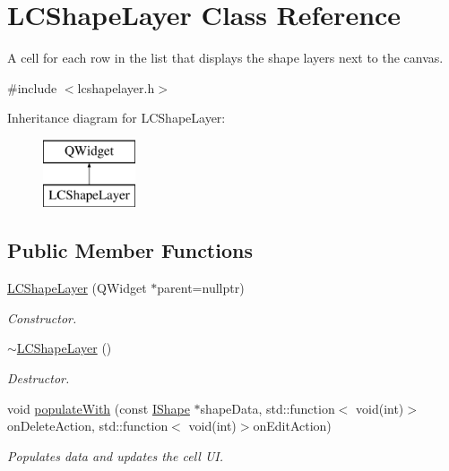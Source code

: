 \hypertarget{class_l_c_shape_layer}{}\section{L\+C\+Shape\+Layer Class Reference}
\label{class_l_c_shape_layer}


A cell for each row in the list that displays the shape layers next to the canvas.  




{\ttfamily \#include $<$lcshapelayer.\+h$>$}

Inheritance diagram for L\+C\+Shape\+Layer\+:\begin{figure}[H]
\begin{center}
\leavevmode
\includegraphics[height=2.000000cm]{class_l_c_shape_layer}
\end{center}
\end{figure}
\subsection*{Public Member Functions}
\begin{DoxyCompactItemize}
\item 
\mbox{\hyperlink{class_l_c_shape_layer_aea8d38a0195a22946abd338d8da618b7}{L\+C\+Shape\+Layer}} (Q\+Widget $\ast$parent=nullptr)
\begin{DoxyCompactList}\small\item\em Constructor. \end{DoxyCompactList}\item 
\mbox{\hyperlink{class_l_c_shape_layer_a293268832a25eac70cfbacb06cee8fe5}{$\sim$\+L\+C\+Shape\+Layer}} ()
\begin{DoxyCompactList}\small\item\em Destructor. \end{DoxyCompactList}\item 
void \mbox{\hyperlink{class_l_c_shape_layer_a4dabe0694c1e04b670be416e567268d3}{populate\+With}} (const \mbox{\hyperlink{class_i_shape}{I\+Shape}} $\ast$shape\+Data, std\+::function$<$ void(int)$>$on\+Delete\+Action, std\+::function$<$ void(int)$>$on\+Edit\+Action)
\begin{DoxyCompactList}\small\item\em Populates data and updates the cell UI. \end{DoxyCompactList}\end{DoxyCompactItemize}


